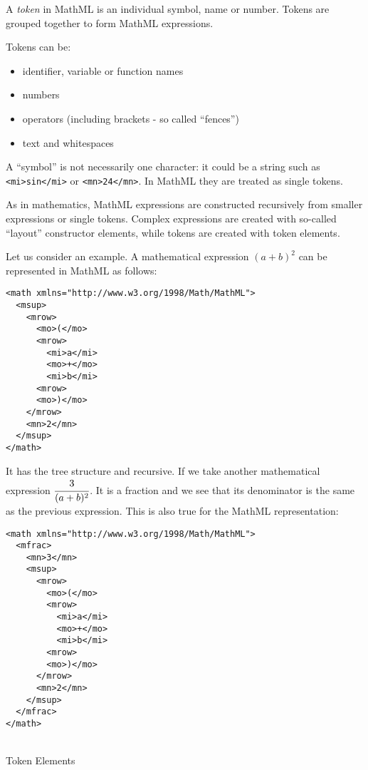 A \emph{token} in MathML is an individual symbol, name or number. Tokens
are grouped together to form MathML expressions.

Tokens can be:

\begin{itemize}
\itemsep1pt\parskip0pt
\item
  identifier, variable or function names
\item
  numbers
\item
  operators (including brackets - so called ``fences'')
\item
  text and whitespaces
\end{itemize}

A ``symbol'' is not necessarily one character: it could be a string such
as \texttt{<mi>sin</mi>}
or \texttt{<mn>24</mn>}.
In MathML they are treated as single tokens.


As in mathematics, MathML expressions are constructed recursively from
smaller expressions or single tokens. Complex expressions are created
with so-called ``layout'' constructor elements, while tokens are created
with token elements.

Let us consider an example. A mathematical expression $(a + b)^2$
can be represented in MathML as follows:

\begin{verbatim}
<math xmlns="http://www.w3.org/1998/Math/MathML">
  <msup>
    <mrow>
      <mo>(</mo>
      <mrow>
        <mi>a</mi>
        <mo>+</mo>
        <mi>b</mi>
      <mrow>
      <mo>)</mo>
    </mrow>
    <mn>2</mn>
  </msup>
</math>
\end{verbatim}


It has the tree structure and recursive. If we take another mathematical
expression $\cfrac{3}{(a + b)^2}$. It is a
fraction and we see that its denominator is the same as the previous
expression. This is also true for the MathML representation:

\begin{verbatim}
<math xmlns="http://www.w3.org/1998/Math/MathML">
  <mfrac>
    <mn>3</mn>
    <msup>
      <mrow>
        <mo>(</mo>
        <mrow>
          <mi>a</mi>
          <mo>+</mo>
          <mi>b</mi>
        <mrow>
        <mo>)</mo>
      </mrow>
      <mn>2</mn>
    </msup>
  </mfrac>
</math>
\end{verbatim}

\ \\


Token Elements


